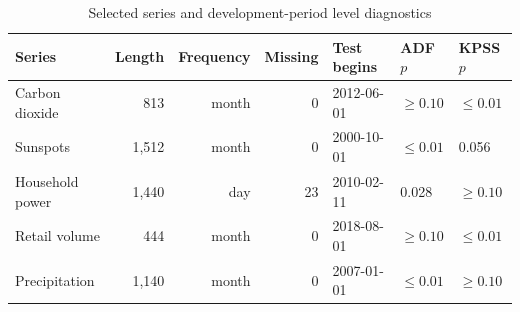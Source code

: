 \begin{table}[t]
\caption{Selected series and development-period level diagnostics}
\label{tab:data}
\centering\small
\begin{tabular}{lrrrlll}
\toprule
Series & Length & Frequency & Missing & Test begins & ADF $p$ & KPSS $p$ \\
\midrule
Carbon dioxide & 813 & month & 0 & 2012-06-01 & $\geq 0.10$ & $\leq 0.01$ \\
Sunspots & 1,512 & month & 0 & 2000-10-01 & $\leq 0.01$ & 0.056 \\
Household power & 1,440 & day & 23 & 2010-02-11 & 0.028 & $\geq 0.10$ \\
Retail volume & 444 & month & 0 & 2018-08-01 & $\geq 0.10$ & $\leq 0.01$ \\
Precipitation & 1,140 & month & 0 & 2007-01-01 & $\leq 0.01$ & $\geq 0.10$ \\
\bottomrule
\end{tabular}
\end{table}

